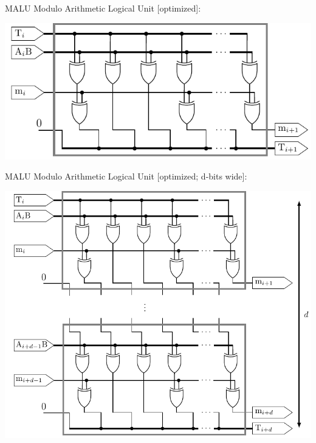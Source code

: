 \documentclass{beamer}
\begin{document}
\begin{frame}{MALU}
	Modulo Arithmetic Logical Unit [optimized]:\\[3mm]
	\begin{center}
		\includegraphics[height=0.5\paperheight]{images/malu-core-optimized}
	\end{center}
\end{frame}

\begin{frame}{MALU}
	Modulo Arithmetic Logical Unit [optimized; d-bits wide]:\\
	\begin{center}
		\includegraphics[height=0.55\paperheight]{images/malu-core-optimized-d}
	\end{center}
\end{frame}
\end{document}
